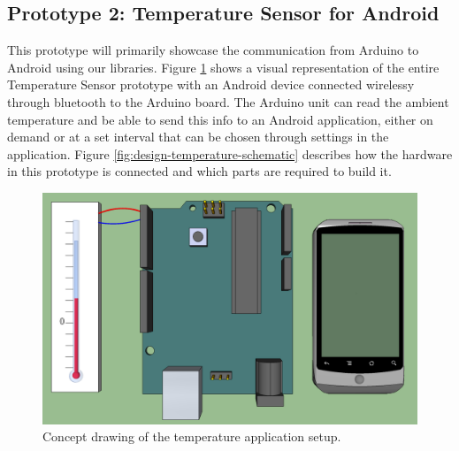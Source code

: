 	
\subsection{Prototype 2: Temperature Sensor for Android} \label{section:prototype-temp}
This prototype will primarily showcase the communication from Arduino to Android using our libraries. 
Figure \ref{fig:design-temperature} shows a visual representation of the entire Temperature Sensor
prototype with an Android device connected wirelessy through bluetooth to the Arduino board. The 
Arduino unit can read the ambient temperature and be able to send this info to an Android application,
 either on demand or at a set interval that can be chosen through settings in the application. Figure \ref{fig:design-temperature-schematic} describes how the hardware in this prototype is connected and which parts are required to build it.

\begin{figure}[h!]
	\centering
	\includegraphics[scale=0.35]{img/design-temperature}
	\caption{Concept drawing of the temperature application setup.}
	\label{fig:design-temperature}
\end{figure}

